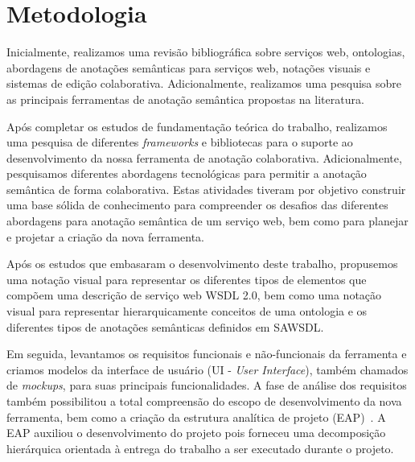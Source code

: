 \section{Metodologia}\label{1-introducao-metodologia}

Inicialmente, realizamos uma revisão bibliográfica sobre serviços web, ontologias, abordagens de anotações semânticas para serviços web, notações visuais e sistemas de edição colaborativa. Adicionalmente, realizamos uma pesquisa sobre as principais ferramentas de anotação semântica propostas na literatura.

Após completar os estudos de fundamentação teórica do trabalho, realizamos uma pesquisa de diferentes \textit{frameworks} e bibliotecas para o suporte ao desenvolvimento da nossa ferramenta de anotação colaborativa. Adicionalmente, pesquisamos diferentes abordagens tecnológicas para permitir a anotação semântica de forma colaborativa. Estas atividades tiveram por objetivo construir uma base sólida de conhecimento para compreender os desafios das diferentes abordagens para anotação semântica de um serviço web, bem como para planejar e projetar a criação da nova ferramenta.

Após os estudos que embasaram o desenvolvimento deste trabalho, propusemos uma notação visual para representar os diferentes tipos de elementos que compõem uma descrição de serviço web WSDL 2.0, bem como uma notação visual para representar hierarquicamente conceitos de uma ontologia e os diferentes tipos de anotações semânticas definidos em SAWSDL.


Em seguida, levantamos os requisitos funcionais e não-funcionais da ferramenta e criamos modelos da interface de usuário (UI - \textit{User Interface}), também chamados de \textit{mockups}, para suas principais funcionalidades. A fase de análise dos requisitos também possibilitou a total compreensão do escopo de desenvolvimento da nova ferramenta, bem como a criação da estrutura analítica de projeto (EAP)~\cite{PMI-2017-PMBOK}. A EAP auxiliou o desenvolvimento do projeto pois forneceu uma decomposição hierárquica orientada à entrega do trabalho a ser executado durante o projeto.

